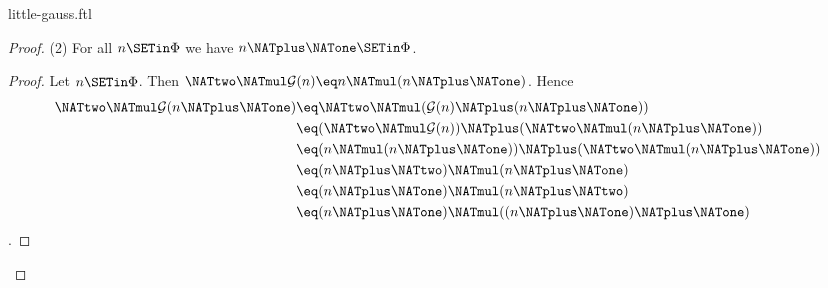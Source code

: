 \documentclass{stex}
\newcommand{\gauss}{\mathcal{G}}
\begin{document}
\begin{smodule}{little-gauss.ftl}
\begin{forthel}
\begin{proof}
    (2) For all $n \SETin \Phi$ we have $n \NATplus \NATone \SETin \Phi$.
    \begin{proof}
      Let $n \SETin \Phi$.
      Then $\NATtwo \NATmul \gauss(n) \eq n \NATmul (n \NATplus \NATone)$.
      Hence
      \begin{align*}
              \NATtwo \NATmul \gauss(n \NATplus \NATone)
        & \eq \NATtwo \NATmul (\gauss(n) \NATplus (n \NATplus \NATone)) \\
        & \eq (\NATtwo \NATmul \gauss(n)) \NATplus (\NATtwo \NATmul (n \NATplus \NATone)) \\
        & \eq (n \NATmul (n \NATplus \NATone)) \NATplus (\NATtwo \NATmul (n \NATplus \NATone)) \\
        & \eq (n \NATplus \NATtwo) \NATmul (n \NATplus \NATone) \\
        & \eq (n \NATplus \NATone) \NATmul (n \NATplus \NATtwo) \\
        & \eq (n \NATplus \NATone) \NATmul ((n \NATplus \NATone) \NATplus \NATone)
      \end{align*}.
    \end{proof}
  \end{proof}
\end{forthel}

\printbibliography
{}
\end{smodule}
\end{document}
